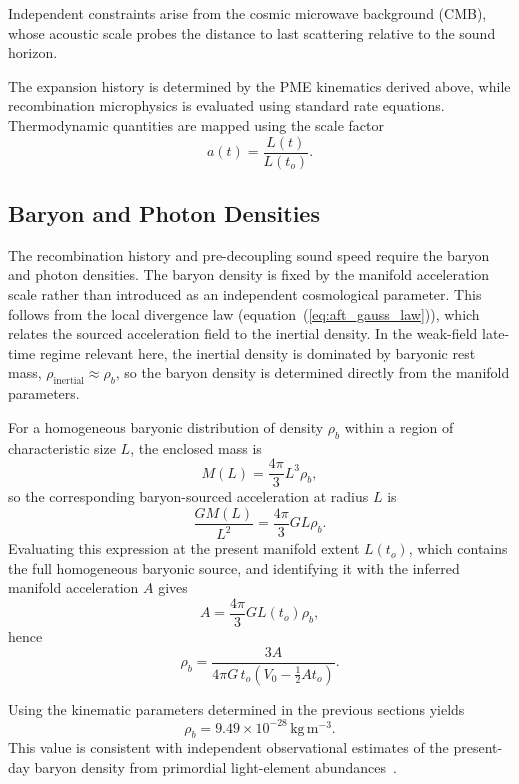 \documentclass[fontsize=12pt, paper=a4]{scrartcl}
\begin{document}
Independent constraints arise from the cosmic microwave background (CMB), whose acoustic scale probes the distance to last scattering relative to the sound horizon.

The expansion history is determined by the PME kinematics derived above, while recombination microphysics is evaluated using standard rate equations. Thermodynamic quantities are mapped using the scale factor
\begin{equation}
a(t) = \frac{L(t)}{L(t_o)} .
\label{eq:scale_factor}
\end{equation}

\subsection{Baryon and Photon Densities}

The recombination history and pre-decoupling sound speed require the baryon and photon densities. The baryon density is fixed by the manifold acceleration scale rather than introduced as an independent cosmological parameter. This follows from the local divergence law (equation~(\ref{eq:aft_gauss_law})), which relates the sourced acceleration field to the inertial density. In the weak-field late-time regime relevant here, the inertial density is dominated by baryonic rest mass, $\rho_{\mathrm{inertial}} \approx \rho_b$, so the baryon density is determined directly from the manifold parameters.

For a homogeneous baryonic distribution of density $\rho_b$ within a region of characteristic size $L$, the enclosed mass is
\begin{equation}
M(L)=\frac{4\pi}{3}L^3\rho_b ,
\end{equation}
so the corresponding baryon-sourced acceleration at radius $L$ is
\begin{equation}
\frac{GM(L)}{L^2}=\frac{4\pi}{3}G L\rho_b .
\end{equation}
Evaluating this expression at the present manifold extent $L(t_o)$, which contains the full homogeneous baryonic source, and identifying it with the inferred manifold acceleration $A$ gives
\begin{equation}
A=\frac{4\pi}{3}G L(t_o)\rho_b ,
\end{equation}
hence
\begin{equation}
\rho_b=\frac{3A}{4\pi G\,t_o\left(V_0-\frac{1}{2}A t_o\right)} .
\end{equation}

Using the kinematic parameters determined in the previous sections yields
\begin{equation}
\rho_b = 9.49\times10^{-28}\,\mathrm{kg\,m^{-3}}.
\end{equation}
This value is consistent with independent observational estimates of the present-day baryon density from primordial light-element abundances~\cite{Cooke2018}.
\end{document}
